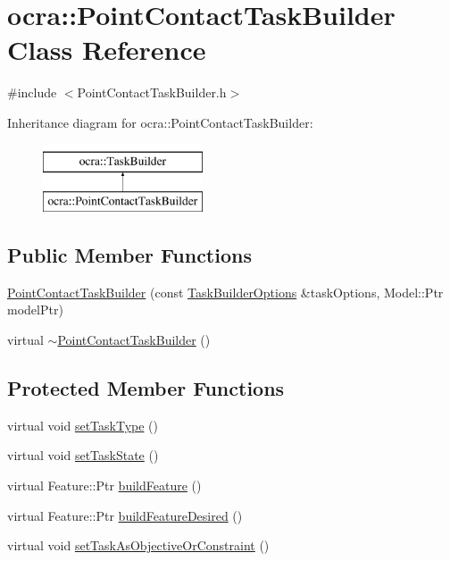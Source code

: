 \hypertarget{classocra_1_1PointContactTaskBuilder}{}\section{ocra\+:\+:Point\+Contact\+Task\+Builder Class Reference}
\label{classocra_1_1PointContactTaskBuilder}


{\ttfamily \#include $<$Point\+Contact\+Task\+Builder.\+h$>$}

Inheritance diagram for ocra\+:\+:Point\+Contact\+Task\+Builder\+:\begin{figure}[H]
\begin{center}
\leavevmode
\includegraphics[height=2.000000cm]{d5/d85/classocra_1_1PointContactTaskBuilder}
\end{center}
\end{figure}
\subsection*{Public Member Functions}
\begin{DoxyCompactItemize}
\item 
\hyperlink{classocra_1_1PointContactTaskBuilder_a36712065646f637a772e84443ea6bb44}{Point\+Contact\+Task\+Builder} (const \hyperlink{classocra_1_1TaskBuilderOptions}{Task\+Builder\+Options} \&task\+Options, Model\+::\+Ptr model\+Ptr)
\item 
virtual \hyperlink{classocra_1_1PointContactTaskBuilder_a33923536a7481e117db39cc4bc7a9d75}{$\sim$\+Point\+Contact\+Task\+Builder} ()
\end{DoxyCompactItemize}
\subsection*{Protected Member Functions}
\begin{DoxyCompactItemize}
\item 
virtual void \hyperlink{classocra_1_1PointContactTaskBuilder_a88d7c619f00708c1b3472ee7dc373f96}{set\+Task\+Type} ()
\item 
virtual void \hyperlink{classocra_1_1PointContactTaskBuilder_a073506c0c849ad4ebd40aebef37f280d}{set\+Task\+State} ()
\item 
virtual Feature\+::\+Ptr \hyperlink{classocra_1_1PointContactTaskBuilder_a220c35d105a88cd0e2407779ab1556f2}{build\+Feature} ()
\item 
virtual Feature\+::\+Ptr \hyperlink{classocra_1_1PointContactTaskBuilder_a253f8fffbd548b63badee23e2c42eb95}{build\+Feature\+Desired} ()
\item 
virtual void \hyperlink{classocra_1_1PointContactTaskBuilder_a729f50dc73c00accb86a9480cb3054fd}{set\+Task\+As\+Objective\+Or\+Constraint} ()
\end{DoxyCompactItemize}

